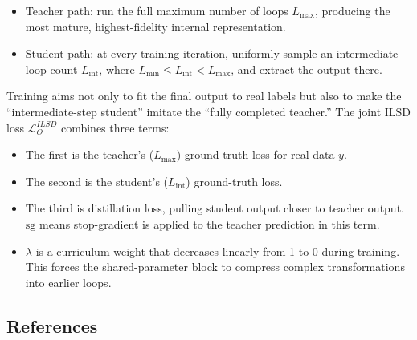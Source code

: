 \begin{itemize}
\tightlist
\item
  Teacher path: run the full maximum number of loops \(L_{\max}\), producing the most mature, highest-fidelity internal representation.
\item
  Student path: at every training iteration, uniformly sample an intermediate loop count \(L_{\mathrm{int}}\), where \(L_{\min}\le L_{\mathrm{int}}\lt L_{\max}\), and extract the output there.
\end{itemize}

Training aims not only to fit the final output to real labels but also to make the ``intermediate-step student'' imitate the ``fully completed teacher.'' The joint ILSD loss \(\mathcal{L}^{ILSD}_{\Theta}\) combines three terms:

\begin{itemize}
\tightlist
\item
  The first is the teacher's (\(L_{\max}\)) ground-truth loss for real data \(y\).
\item
  The second is the student's (\(L_{\mathrm{int}}\)) ground-truth loss.
\item
  The third is distillation loss, pulling student output closer to teacher output. \(\mathrm{sg}\) means stop-gradient is applied to the teacher prediction in this term.
\item
  \(\lambda\) is a curriculum weight that decreases linearly from 1 to 0 during training. This forces the shared-parameter block to compress complex transformations into earlier loops.
\end{itemize}

\FloatBarrier
{}
\hypertarget{references-141}{%
\subsection{References}\label{references-141}}

